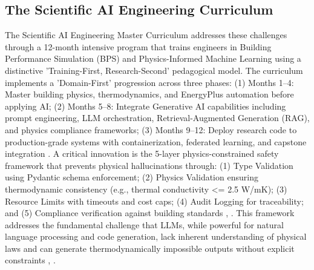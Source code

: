 \documentclass[12pt,a4paper]{article}
\begin{document}
\subsection{The Scientific AI Engineering Curriculum}
The Scientific AI Engineering Master Curriculum addresses these challenges through a 12-month intensive program that trains engineers in Building Performance Simulation (BPS) and Physics-Informed Machine Learning using a distinctive 'Training-First, Research-Second' pedagogical model. The curriculum implements a 'Domain-First' progression across three phases: (1) Months 1--4: Master building physics, thermodynamics, and EnergyPlus automation before applying AI; (2) Months 5--8: Integrate Generative AI capabilities including prompt engineering, LLM orchestration, Retrieval-Augmented Generation (RAG), and physics compliance frameworks; (3) Months 9--12: Deploy research code to production-grade systems with containerization, federated learning, and capstone integration \cite{ref170}.
A critical innovation is the 5-layer physics-constrained safety framework that prevents physical hallucinations through: (1) Type Validation using Pydantic schema enforcement; (2) Physics Validation ensuring thermodynamic consistency (e.g., thermal conductivity <= 2.5 W/mK); (3) Resource Limits with timeouts and cost caps; (4) Audit Logging for traceability; and (5) Compliance verification against building standards \cite{ref170}, \cite{ref49}. This framework addresses the fundamental challenge that LLMs, while powerful for natural language processing and code generation, lack inherent understanding of physical laws and can generate thermodynamically impossible outputs without explicit constraints \cite{ref21}, \cite{ref56}.
\end{document}
